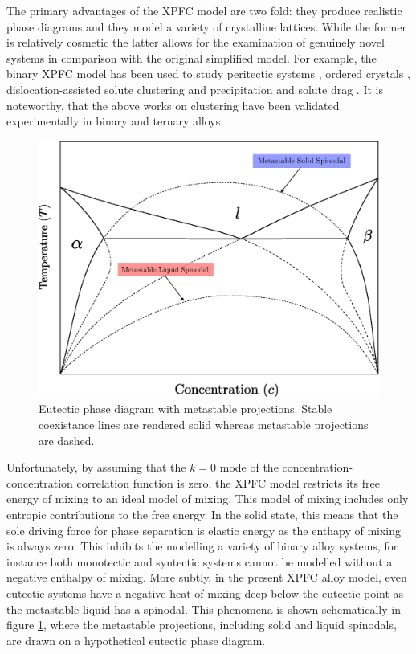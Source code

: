 \documentclass[showkeys, prb, reprint]{revtex4-1}
\begin{document}
The primary advantages of the XPFC model are two fold: they produce realistic
phase diagrams and they model a variety of crystalline lattices. While the
former is relatively cosmetic the latter allows for the examination of
genuinely novel systems in comparison with the original simplified model. For
example, the binary XPFC model has been used to study peritectic systems
\cite{GREENWOOD11_BINARY}, ordered crystals \cite{ALSTER17},
dislocation-assisted solute clustering and precipitation \cite{FALLAH12,
FALLAH13} and solute drag \cite{GREENWOOD12}. It is noteworthy, that the above
works on clustering have been validated experimentally in binary and ternary
alloys.

\begin{figure}
    \centering
    \includegraphics[scale=0.4]{eutectic-drawing}
    \caption[Eutectic Phase Diagram with Metastable Projections]{
        \label{fig:eutectic_drawing} Eutectic phase diagram with metastable
        projections. Stable coexistance lines are rendered solid whereas 
        metastable projections are dashed.
    }
\end{figure}

Unfortunately, by assuming that the $k=0$ mode of the
concentration-concentration correlation function is zero, the XPFC model
restricts its free energy of mixing to an ideal model of mixing. This model of
mixing includes only entropic contributions to the free energy. In the solid
state, this means that the sole driving force for phase separation is elastic
energy as the enthapy of mixing is always zero. This inhibits the modelling a
variety of binary alloy systems, for instance both monotectic and syntectic
systems cannot be modelled without a negative enthalpy of mixing.  More subtly,
in the present XPFC alloy model, even eutectic systems have a negative heat of
mixing deep below the eutectic point as the metastable liquid has a spinodal.
This phenomena is shown schematically in figure \ref{fig:eutectic_drawing},
where the metastable projections, including solid and liquid spinodals, are
drawn on a hypothetical eutectic phase diagram.
\end{document}
